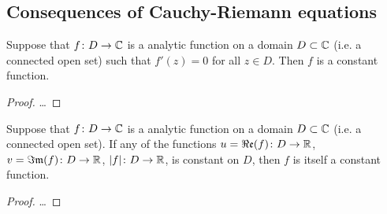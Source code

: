 \subsection{Consequences of Cauchy-Riemann equations}

\begin{lemma}
  \label{lem:zero_derivative_implies_constant}
  Suppose that $f \colon D \to \mathbb{C}$ is a analytic function
  on a domain $D \subset \mathbb{C}$ (i.e. a connected open set)
  such that $f'(z) = 0$ for all $z \in D$.
  Then $f$ is a constant function.
\end{lemma}
\begin{proof}
  \ldots
\end{proof}

\begin{theorem}
  \label{thm:constantness_criteria}
  Suppose that $f \colon D \to \mathbb{C}$ is a analytic function
  on a domain $D \subset \mathbb{C}$ (i.e. a connected open set).
  If any of the functions $u = \Re\mathfrak{e}(f) \colon D \to \mathbb{R}$,
  $v = \Im\mathfrak{m}(f) \colon D \to \mathbb{R}$, $|f| \colon D \to \mathbb{R}$,
  is constant on $D$, then $f$ is itself a constant function.
\end{theorem}
\begin{proof}
  \ldots
\end{proof}
